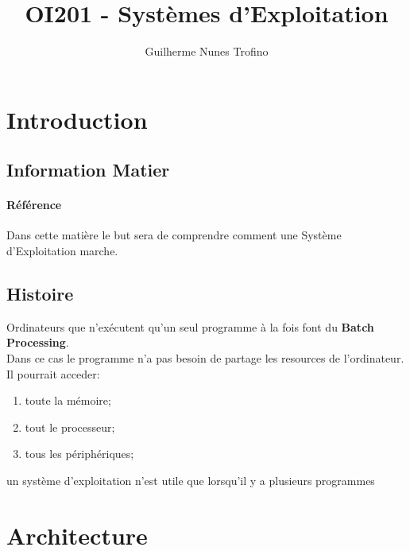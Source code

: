 \documentclass{article}
\title{OI201 - Systèmes d'Exploitation}
\author{Guilherme Nunes Trofino}
\begin{document}
\maketitle


\newpage\tableofcontents

\section{Introduction}

% 
% 
% 


\subsection{Information Matier}
\paragraph{Référence}Dans cette matière le but sera de comprendre comment une Système d'Exploitation marche.

\subsection{Histoire}
\begin{definition}\label{def:batchProcessing}
    Ordinateurs que n'exécutent qu'un seul programme à la fois font du \textbf{Batch Processing}.\\
    
    Dans ce cas le programme n'a pas besoin de partage les resources de l'ordinateur. Il pourrait acceder:
    \begin{enumerate}[noitemsep]
        \item toute la mémoire;
        \item tout le processeur;
        \item tous les périphériques;
    \end{enumerate}

    \begin{phrase}
        un système d'exploitation n'est utile que lorsqu'il y a plusieurs programmes
    \end{phrase}
\end{definition}

\section{Architecture}
\end{document}
